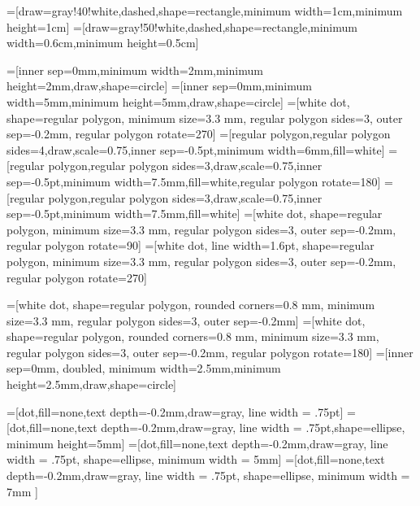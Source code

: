 =[draw=gray!40!white,dashed,shape=rectangle,minimum width=1cm,minimum height=1cm]
=[draw=gray!50!white,dashed,shape=rectangle,minimum width=0.6cm,minimum height=0.5cm]

\newcommand{\measurement}{\tikz[scale=0.6]{ \draw [use as bounding box,draw=none] (0,-0.1) rectangle (1,0.7); \draw [fill=white] (1,0) arc (0:180:5mm); \draw (0,0) -- (1,0) (0.5,0) -- +(60:7mm);}}


=[inner sep=0mm,minimum width=2mm,minimum height=2mm,draw,shape=circle]
=[inner sep=0mm,minimum width=5mm,minimum height=5mm,draw,shape=circle]
=[white dot, shape=regular polygon, minimum size=3.3 mm, regular polygon sides=3, outer sep=-0.2mm, regular polygon rotate=270]
=[regular polygon,regular polygon sides=4,draw,scale=0.75,inner sep=-0.5pt,minimum width=6mm,fill=white]
=[regular polygon,regular polygon sides=3,draw,scale=0.75,inner sep=-0.5pt,minimum width=7.5mm,fill=white,regular polygon rotate=180]
=[regular polygon,regular polygon sides=3,draw,scale=0.75,inner sep=-0.5pt,minimum width=7.5mm,fill=white]
=[white dot, shape=regular polygon, minimum size=3.3 mm, regular polygon sides=3, outer sep=-0.2mm, regular polygon rotate=90]
=[white dot, line width=1.6pt, shape=regular polygon, minimum size=3.3 mm, regular polygon sides=3, outer sep=-0.2mm, regular polygon rotate=270]

=[white dot, shape=regular polygon, rounded corners=0.8 mm, minimum size=3.3 mm, regular polygon sides=3, outer sep=-0.2mm]
=[white dot, shape=regular polygon, rounded corners=0.8 mm, minimum size=3.3 mm, regular polygon sides=3, outer sep=-0.2mm, regular polygon rotate=180]
=[inner sep=0mm, doubled, minimum width=2.5mm,minimum height=2.5mm,draw,shape=circle]

=[dot,fill=none,text depth=-0.2mm,draw=gray, line width = .75pt]
=[dot,fill=none,text depth=-0.2mm,draw=gray, line width = .75pt,shape=ellipse, minimum height=5mm]
=[dot,fill=none,text depth=-0.2mm,draw=gray, line width = .75pt, shape=ellipse, minimum width = 5mm]
=[dot,fill=none,text depth=-0.2mm,draw=gray, line width = .75pt, shape=ellipse, minimum width = 7mm ]


